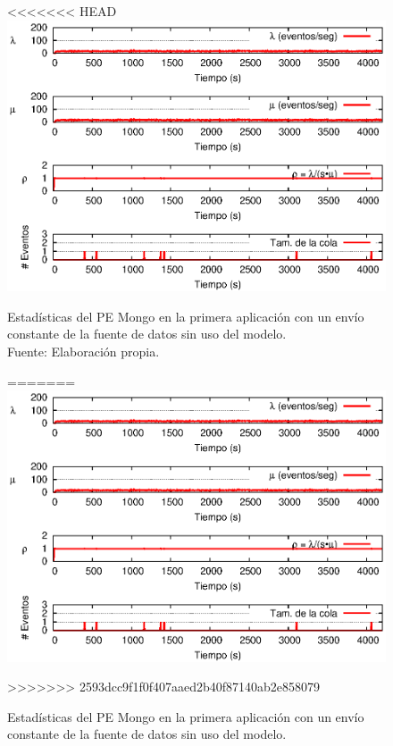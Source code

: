 \begin{figure}[!ht]
<<<<<<< HEAD
    \centering
    \captionsetup{justification=centering}
    \includegraphics[scale=1]{images/exp/app1/uniform/sm/statusMongoPE.eps}
    \caption[Estadísticas del PE Mongo en la primera aplicación con un envío constante de la fuente de datos sin uso del modelo.]{Estadísticas del PE Mongo en la primera aplicación con un envío constante de la fuente de datos sin uso del modelo.\\Fuente: Elaboración propia.}
=======
\centering
    \includegraphics[scale=1.1]{images/exp/app1/uniform/sm/statusMongoPE.eps}
    \caption{Estad\'isticas del PE Mongo en la primera aplicaci\'on con un env\'io constante de la fuente de datos sin uso del modelo.}
>>>>>>> 2593dcc9f1f0f407aaed2b40f87140ab2e858079
    \label{fig:app1-uniform-statusMongoPE-sm}
\end{figure}

